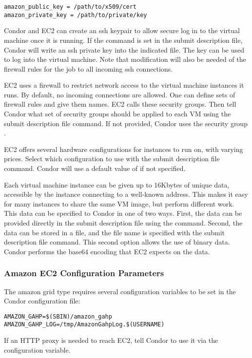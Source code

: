 \begin{verbatim}
amazon_public_key = /path/to/x509/cert
amazon_private_key = /path/to/private/key
\end{verbatim}

Condor and EC2 can create an ssh keypair to allow secure log in
to the virtual machine once it is running.
If the command
 is set in the submit description file,
Condor will write an ssh private key into the indicated file.
The key can be used to log into the virtual machine.
Note that modification will also be needed of the firewall
rules for the job to all incoming ssh connections.

EC2 uses a firewall to restrict network access to the virtual machine
instances it runs. By default, no incoming connections are allowed.
One can define sets of firewall rules and give them names.
EC2 calls these security groups. 
Then tell Condor what set of security
groups should be applied to each VM using the
 submit description file command.
If not provided, Condor uses the security group .

EC2 offers several hardware configurations for instances to run on, with
varying prices. 
Select which configuration to use with the
 submit description file command.
Condor will use a default value of
 if not specified.

Each virtual machine instance can be given up to 16Kbytes of unique data, 
accessible by the instance connecting to a well-known address.
This makes it easy for many instances to share the same VM image,
but perform different work.
This data can be specified to Condor in one of two ways.
First, the data can be provided directly in the submit description file 
using the  command.
Second, the data can be
stored in a file, and the file name is specified with the
 submit description file command.
This second option allows the use of binary data.
Condor performs the base64 encoding that EC2 expects on the data.

\subsubsection{\label{sec:Amazon-config}Amazon EC2 Configuration Parameters}

The amazon grid type requires several configuration variables 
to be set in the Condor configuration file:

\footnotesize
\begin{verbatim}
AMAZON_GAHP=$(SBIN)/amazon_gahp
AMAZON_GAHP_LOG=/tmp/AmazonGahpLog.$(USERNAME)
\end{verbatim}
\normalsize

If an HTTP proxy is needed to reach EC2, tell Condor to use it
via the  configuration variable.
